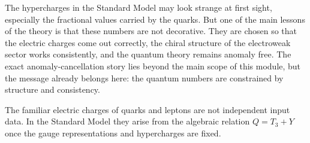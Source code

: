 \documentclass[11pt,a4paper]{article}
\begin{document}
The hypercharges in the Standard Model may look strange at first sight, especially the fractional values carried by the quarks. But one of the main lessons of the theory is that these numbers are not decorative. They are chosen so that the electric charges come out correctly, the chiral structure of the electroweak sector works consistently, and the quantum theory remains anomaly free. The exact anomaly-cancellation story lies beyond the main scope of this module, but the message already belongs here: the quantum numbers are constrained by structure and consistency.

\begin{takehomebox}
\vspace{0.25cm}
The familiar electric charges of quarks and leptons are not independent input data. In the Standard Model they arise from the algebraic relation \(Q=T_3+Y\) once the gauge representations and hypercharges are fixed.
\end{takehomebox}
\end{document}
